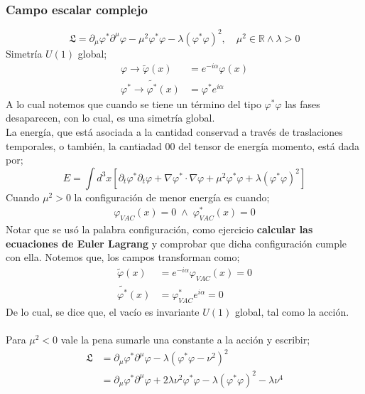 \documentclass[../main.tex]{subfiles}
\begin{document}
 \subsubsection{Campo escalar complejo}
 \begin{equation}
   \mathfrak{L} = \partial_\mu \varphi^* \partial^\mu \varphi -\mu^2 \varphi^*\varphi - \lambda \left( \varphi^* \varphi \right)^2,\quad \mu^2 \in \mathbb{R} \wedge \lambda >0
  \end{equation}
  Simetría $U(1)$ global;
\begin{align*}
  \varphi \rightarrow \tilde{\varphi}(x) & = e^{-i\alpha}\varphi(x) \\
  \varphi^* \rightarrow \tilde{\varphi^*}(x) & = \varphi^* e^{i\alpha}
\end{align*} 
A lo cual notemos que cuando se tiene un término del tipo $\varphi^*\varphi$ las fases desaparecen, con lo cual, es una simetría global. \\
La energía, que está asociada a la cantidad conservad a través de traslaciones temporales, o también, la cantiadad $00$ del tensor de energía momento, está dada por;
\begin{equation}
  E=\int d^3x \left[ \partial_t\varphi^* \partial_t \varphi + \nabla\varphi^* \cdot \nabla \varphi + \mu^2 \varphi^* \varphi + \lambda \left( \varphi^*\varphi \right)^2 \right]
 \end{equation}
 Cuando $\mu^2>0$ la configuración de menor energía es cuando;
 \begin{align*}
   \varphi_{VAC}(x) = 0 \; \wedge \; \varphi_{VAC}^*(x) = 0
 \end{align*}
Notar que se usó la palabra configuración, como ejercicio \textbf{calcular las ecuaciones de Euler Lagrang} y comprobar que dicha configuración cumple con ella. Notemos que, los campos transforman como;
\begin{align*}
  \tilde{\varphi}(x)& = e^{-i\alpha}\varphi_{VAC}(x) = 0 \\
  \tilde{\varphi^*}(x) & = \varphi^*_{VAC}e^{i\alpha} = 0
\end{align*}
De lo cual, se dice que, el vacío es invariante $U(1)$ global, tal como la acción. \\
\\
Para $\mu^2<0$ vale la pena sumarle una constante a la acción y escribir;
\begin{align*}
  \mathfrak{L} & = \partial_\mu \varphi^* \partial^\mu \varphi - \lambda \left( \varphi^* \varphi - \nu^2 \right)^2 \\
  & = \partial_\mu \varphi^* \partial^\mu\varphi + 2\lambda \nu^2 \varphi^* \varphi - \lambda \left( \varphi^* \varphi \right)^2 - \lambda \nu^4
 \end{align*}
\end{document}
